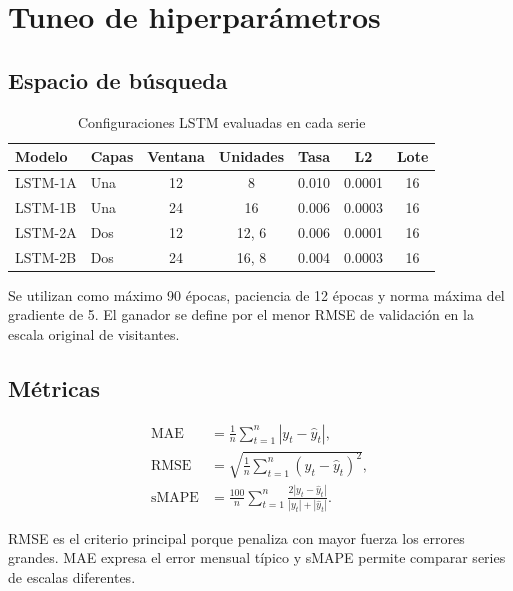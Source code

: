 \documentclass[11pt,letterpaper]{article}
\begin{document}
\vspace{5cm}

\section{Tuneo de hiperparámetros}

\subsection{Espacio de búsqueda}

\begin{table}[H]
\centering
\caption{Configuraciones LSTM evaluadas en cada serie}
\label{tab:configuraciones}
\begin{tabular}{llccccc}
\toprule
\textbf{Modelo} & \textbf{Capas} & \textbf{Ventana} &
\textbf{Unidades} & \textbf{Tasa} & \textbf{L2} & \textbf{Lote}\\
\midrule
LSTM-1A & Una & 12 & 8 & 0.010 & 0.0001 & 16\\
LSTM-1B & Una & 24 & 16 & 0.006 & 0.0003 & 16\\
LSTM-2A & Dos & 12 & 12, 6 & 0.006 & 0.0001 & 16\\
LSTM-2B & Dos & 24 & 16, 8 & 0.004 & 0.0003 & 16\\
\bottomrule
\end{tabular}
\end{table}

Se utilizan como máximo 90 épocas, paciencia de 12 épocas y norma máxima del
gradiente de 5. El ganador se define por el menor RMSE de validación en la
escala original de visitantes.

\subsection{Métricas}

\begin{align}
\operatorname{MAE}
&=\frac{1}{n}\sum_{t=1}^{n}|y_t-\widehat{y}_t|,\\
\operatorname{RMSE}
&=\sqrt{\frac{1}{n}\sum_{t=1}^{n}(y_t-\widehat{y}_t)^2},\\
\operatorname{sMAPE}
&=\frac{100}{n}\sum_{t=1}^{n}
\frac{2|y_t-\widehat{y}_t|}
{|y_t|+|\widehat{y}_t|}.
\end{align}

RMSE es el criterio principal porque penaliza con mayor fuerza los errores
grandes. MAE expresa el error mensual típico y sMAPE permite comparar series
de escalas diferentes.
\end{document}
